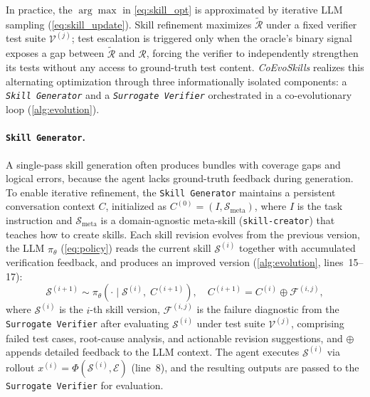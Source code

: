 \documentclass{article}
\newcommand{\method}{\textit{CoEvoSkills}\xspace}
\newcommand{\skill}{\mathcal{S}}
\begin{document}
In practice, the $\arg\max$ in \autoref{eq:skill_opt} is approximated by iterative LLM sampling (\autoref{eq:skill_update}). Skill refinement maximizes $\tilde{\mathcal{R}}$ under a fixed verifier test suite $\mathcal{V}^{(j)}$; test escalation is triggered only when the oracle's binary signal exposes a gap between $\tilde{\mathcal{R}}$ and $\mathcal{R}$, forcing the verifier to independently strengthen its tests without any access to ground-truth test content. \method realizes this alternating optimization through three informationally isolated components: a \emph{\texttt{Skill Generator}} and a \emph{\texttt{Surrogate Verifier}} orchestrated in a co-evolutionary loop (\autoref{alg:evolution}).


\paragraph{\texttt{Skill Generator}.}
A single-pass skill generation often produces bundles with coverage gaps and logical errors, because the agent lacks ground-truth feedback during generation. To enable iterative refinement, the \texttt{Skill Generator} maintains a persistent conversation context $C$, initialized as $C^{(0)} = (I, \skill_{\mathrm{meta}})$, where $I$ is the task instruction and $\skill_{\mathrm{meta}}$ is a domain-agnostic meta-skill (\texttt{skill-creator}) that teaches how to create skills. Each skill revision evolves from the previous version, the LLM $\pi_\theta$ (\autoref{eq:policy}) reads the current skill $\skill^{(i)}$ together with accumulated verification feedback, and produces an improved version (\autoref{alg:evolution}, lines~15--17):
\begin{equation}
    \skill^{(i+1)} \sim \pi_\theta\!\left(\cdot \mid \skill^{(i)},\; C^{(i+1)}\right), \quad
    C^{(i+1)} = C^{(i)} \oplus \mathcal{F}^{(i,j)},
    \label{eq:skill_update}
\end{equation}
where $\skill^{(i)}$ is the $i$-th skill version, $\mathcal{F}^{(i,j)}$ is the failure diagnostic from the \texttt{Surrogate Verifier} after evaluating $\skill^{(i)}$ under test suite $\mathcal{V}^{(j)}$, comprising failed test cases, root-cause analysis, and actionable revision suggestions, and $\oplus$ appends detailed feedback to the LLM context. The agent executes $\skill^{(i)}$ via rollout $x^{(i)} = \Phi(\skill^{(i)}, \mathcal{E})$ (line~8), and the resulting outputs are passed to the \texttt{Surrogate Verifier} for evaluation.
\end{document}
